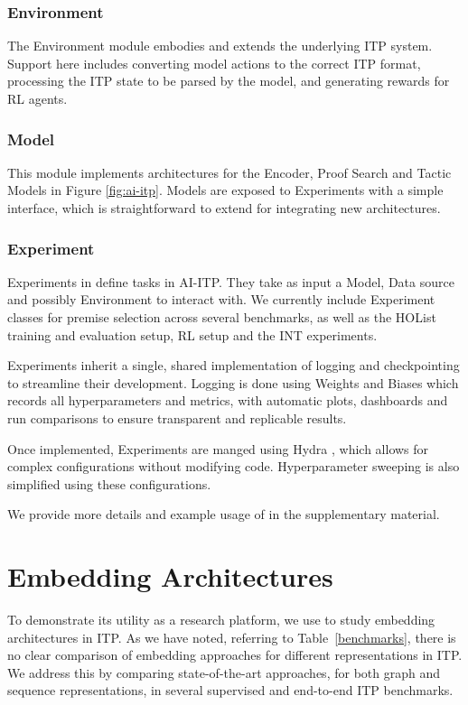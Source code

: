 \documentclass[letterpaper]{article} %
\newcommand{\sysname}{\textsc{\sffamily{Bait}}}
\newcommand\alg[1]{\textsc{\sffamily{#1}}}%
\newcommand\dataset[1]{#1}
\begin{document}
    \subsubsection{Environment}
    The Environment module embodies and extends the underlying ITP system. Support here includes converting model actions to the correct ITP format, processing the ITP state to be parsed by the model, and generating rewards for RL agents.

    \subsubsection{Model}
    This module implements architectures for the Encoder, Proof Search and Tactic Models in Figure \ref{fig:ai-itp}.
    Models are exposed to Experiments with a simple interface, which is straightforward to extend for integrating new architectures.

    \subsubsection{Experiment}
    Experiments in \sysname{} define tasks in AI-ITP. They take as input a Model, Data source and possibly Environment to interact with.
    We currently include Experiment classes for premise selection across several benchmarks, as well as the \dataset{HOList} \cite{paliwal_graph_2020} training and evaluation setup, \alg{TacticZero} RL setup \cite{wu_tacticzero_2021} and the INT \cite{wu_int_2020} experiments.

    Experiments inherit a single, shared implementation of logging and checkpointing to streamline their development.
    Logging is done using Weights and Biases \cite{wandb} which records all hyperparameters and metrics, with automatic plots, dashboards and run comparisons to ensure transparent and replicable results.

    Once implemented, Experiments are manged using Hydra \cite{yadan_hydra_2019}, which allows for complex configurations without modifying code. Hyperparameter sweeping is also simplified using these configurations.

    We provide more details and example usage of \sysname{} in the supplementary material.


    \section{Embedding Architectures}
    To demonstrate its utility as a research platform, we use \sysname{} to study embedding architectures in ITP.
    As we have noted, referring to Table~\ref{benchmarks}, there is no clear comparison of embedding approaches for different representations in ITP.
    We address this by comparing state-of-the-art approaches,
    for both graph and sequence representations,
    in several supervised and end-to-end ITP benchmarks.
\end{document}
